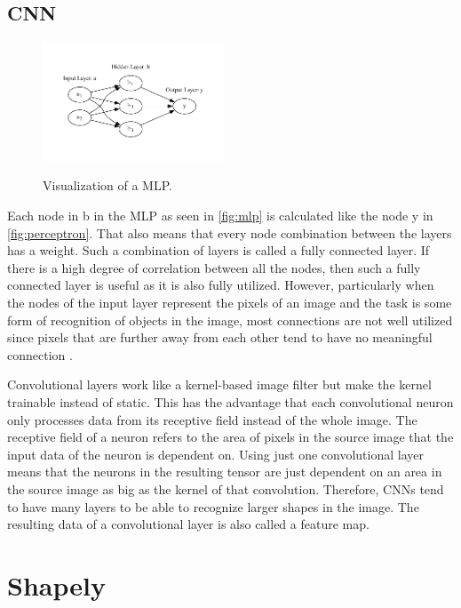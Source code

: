 \documentclass[10pt]{book}
\newcommand{\figureref}[1]{\autoref{#1}}
\begin{document}
\subsection{CNN}

\begin{figure}
  \caption{Visualization of a \ac{MLP}.}
  \includegraphics[width=0.48\textwidth]{graph/mlp}
  \label{fig:mlp} 
\end{figure}

Each node in b in the \ac{MLP} as seen in \figureref{fig:mlp} is calculated like the node y in \figureref{fig:perceptron}. That also means that every node combination between the layers has a weight. Such a combination of layers is called a fully connected layer. If there is a high degree of correlation between all the nodes, then such a fully connected layer is useful as it is also fully utilized. However, particularly when the nodes of the input layer represent the pixels of an image and the task is some form of recognition of objects in the image, most connections are not well utilized since pixels that are further away from each other tend to have no meaningful connection \cite{aghdam2017guide}.

Convolutional layers work like a kernel-based image filter but make the kernel trainable instead of static. This has the advantage that each convolutional neuron only processes data from its receptive field instead of the whole image. The receptive field of a neuron refers to the area of pixels in the source image that the input data of the neuron is dependent on. Using just one convolutional layer means that the neurons in the resulting tensor are just dependent on an area in the source image as big as the kernel of that convolution. Therefore, \acp{CNN} tend to have many layers to be able to recognize larger shapes in the image. The resulting data of a convolutional layer is also called a feature map. 

\section{Shapely} %
\end{document}
